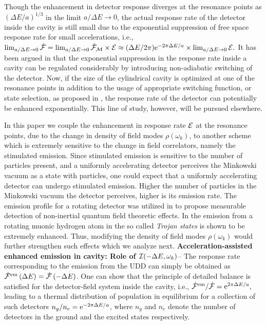 \documentclass[aps,prl,nofootinbib,preprintnumbers,floatfix,twocolumn,superscriptaddress]{revtex4}
\def\l{\left}
\def\r{\right}
\def\e{{\rm e}}
\begin{document}
Though the enhancement in detector response diverges at the resonance points 
as $\l(\Delta E/a\r)^{1/3}$ in the limit $a/\Delta E \to 0$, the actual response 
rate of the detector inside the cavity is still small due 
to the exponential suppression of free space response rate for small accelerations, i.e., 
$\lim_{a/\Delta E \to 0} {\dot {\cal F}} 
=\lim_{a/\Delta E \to 0}{\dot {\cal F}}_{\cal M} \times {\cal E} \approx 
(\Delta E/2\pi) \e^{-2\pi \Delta E/a} \times \lim_{a/\Delta E \to 0} {\cal E}.$
It has been argued in \cite{Scully-2003} that the exponential suppression
in the response rate inside a cavity 
can be regulated considerably by introducing non-adiabatic switching
of the detector. Now, if the size of the cylindrical cavity is optimized 
at one of the resonance points in addition to the usage of appropriate switching function, or 
state selection, as proposed in \cite{Scully-2003}, the response rate of the detector can potentially 
be enhanced exponentially. This line of study, however, will be pursued elsewhere. 

In this paper we couple 
the enhancement in response rate ${\cal E}$ at the resonance points, due to the change in 
density of field modes $\rho(\omega_{k})$, to another scheme which is 
extremely sensitive to the change in field correlators, namely the stimulated emission. 
Since stimulated emission is sensitive to the number of particles 
present, and a uniformly 
accelerating detector perceives the Minkowski vacuum as a state with particles, 
one could expect that a uniformly accelerating detector can undergo 
stimulated emission. Higher the number of particles in the Minkowski vacuum 
the detector 
perceives, higher is its emission rate. The emission profile
for a rotating detector was utilized in 
\cite{Lochan-2020} to propose measurable 
detection of non-inertial quantum field theoretic effects. 
In \cite{Kalinski-2005} the emission from a rotating muonic hydrogen atom 
in the so called {\it Trojan states} is shown to be extremely enhanced. 
Thus, modifying the 
density of field modes $\rho(\omega_{k})$ would further strengthen such effects 
which we analyze next.
\vskip 5pt
\noindent
{\bf Acceleration-assisted enhanced emission in cavity: 
Role of ${\cal I}(-\Delta E, \omega_k)$}--
The response rate corresponding to the emission from the UDD can simply be 
obtained as ${\dot {\cal F}}^{\rm em} \l(\Delta E\r)
={\dot {\cal F}} \l(-\Delta E\r)$. 
One can show that the principle of detailed balance is satisfied 
for the detector-field system inside the cavity, i.e.,
${\dot {\cal F}}^{\rm em}/{\dot {\cal F}}=\e^{2\pi \Delta E/a},$ 
leading to a thermal distribution of population
in equilibrium for a collection of such detectors $n_g/n_e = \e^{-2\pi \Delta E/a}$, 
where $n_g$ and $n_e$ denote the number of detectors in the ground and the excited states respectively. 
\end{document}
